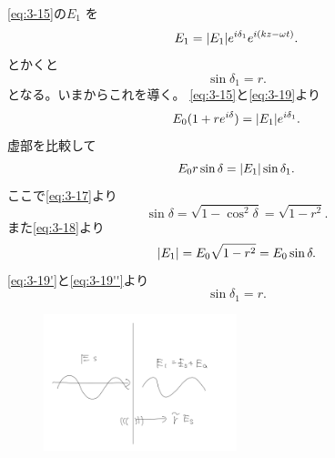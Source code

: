 \documentclass[dvipdfmx,12pt]{jsarticle}
\begin{document}
\eqref{eq:3-15}の$E_1$ を
\begin{equation}
\label{eq:3-19}
E_1=\abs{E_1}e^{i\delta_1}e^{i(kz-\omega t)}
.\end{equation}
とかくと
\[
\sin \delta_1=r
.\] 
となる。いまからこれを導く。
\eqref{eq:3-15}と\eqref{eq:3-19}より
\[
E_0(1+re^{i\delta})=\abs{E_{1}}e^{i\delta_1}
.\] 
虚部を比較して
\begin{equation}
\label{eq:3-19'}
E_0 r\sin \delta=\abs{E_1}\sin \delta_1
.\end{equation}
ここで\eqref{eq:3-17}より
\[
\sin \delta=\sqrt{1-\cos ^2\delta} =\sqrt{1-r^2} 
.\] 
また\eqref{eq:3-18}より
\begin{equation}
\label{eq:3-19''}
	\abs{E_1}=E_0\sqrt{1-r^2} =E_0\sin \delta
.\end{equation}
\eqref{eq:3-19'}と\eqref{eq:3-19''}より
\begin{equation}
\label{eq:3-20}
	\sin \delta_1=r
.\end{equation}
\begin{figure}[H]
	\centering
	\includegraphics[width=0.5\textwidth]{fig3/Fig-4.jpg}
	\label{fig:fig3-Fig-4-jpg}
\end{figure}
\end{document}

